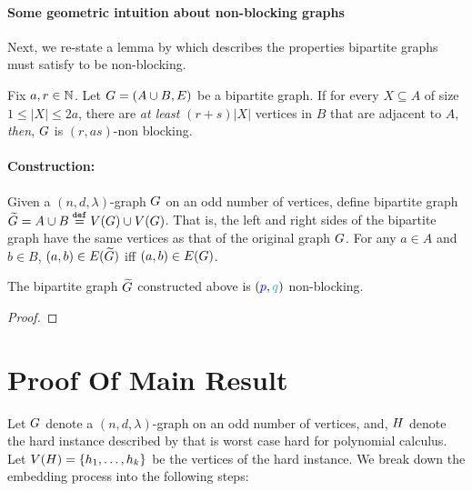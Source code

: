 \documentclass[11pt]{article}
\newcommand{\EnDeeLambda}{(n, d, \lambda)}
\begin{document}
\paragraph{Some geometric intuition about non-blocking graphs} \par


Next, we re-state a lemma by \citep[Proposition 1]{feldman1988wide} which describes the properties bipartite graphs must satisfy to be non-blocking.

\begin{lemma}
Fix $a, r \in \mathbb{N}$. Let $G = (A \cup B, E)$ be a bipartite graph.
If for every $X \subseteq A$ of size $1 \leq |X| \leq 2a$, there are \emph{at least} $(r + s)|X|$ vertices in $B$ that are adjacent to $A$, \emph{then}, $G$ is $(r, as)$-non blocking.
\end{lemma}

\paragraph{Construction:} Given a $\EnDeeLambda$-graph $G$ on an odd number of vertices, define bipartite graph $\widetilde{G}  = A \cup B \overset{\mathtt{def}}{=} V(G) \cup V(G)$.
That is, the left and right sides of the bipartite graph have the same vertices as that of the original graph $G$.
For any $a \in A$ and $b \in B$, $(a,b) \in E(\widetilde{G})$ iff $(a,b) \in E(G)$.

\begin{lemma}\label{lemma: bipartite-construct-non-block}
The bipartite graph $\widetilde{G}$ constructed above is $(\pee, \qu)$ non-blocking.
\end{lemma}

\begin{proof}
	
\end{proof}

\section{Proof Of Main Result}


Let $G$ denote a $\EnDeeLambda$-graph on an odd number of vertices, and,  $H$ denote the hard instance described by  that is worst case hard for polynomial calculus.
Let $V(H) = \left\{ h_1, \dots, h_k\right\}$ be the vertices of the hard instance.
We break down the embedding process into the following steps:
\end{document}
